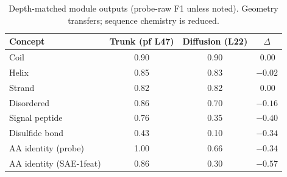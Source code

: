 \begin{table}[H]\centering
  \caption{Depth-matched module outputs (probe-raw F1 unless noted). Geometry
  transfers; sequence chemistry is reduced.}
  \label{tab:headline}
  \small
  \begin{tabular}{lccc}
    \toprule
    Concept & Trunk (pf L47) & Diffusion (L22) & $\Delta$ \\
    \midrule
    Coil                    & 0.90 & 0.90 & $\,$0.00 \\
    Helix                   & 0.85 & 0.83 & $-0.02$ \\
    Strand                  & 0.82 & 0.82 & $\,$0.00 \\
    Disordered              & 0.86 & 0.70 & $-0.16$ \\
    Signal peptide          & 0.76 & 0.35 & $-0.40$ \\
    Disulfide bond          & 0.43 & 0.10 & $-0.34$ \\
    AA identity (probe)     & 1.00 & 0.66 & $-0.34$ \\
    AA identity (SAE-1feat) & 0.86 & 0.30 & $-0.57$ \\
    \bottomrule
  \end{tabular}
\end{table}
